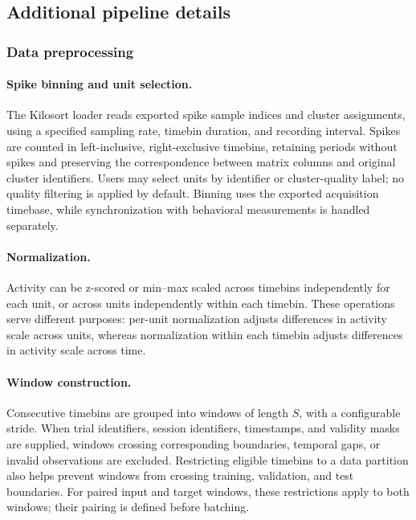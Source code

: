 \subsection{Additional pipeline details}
\label{subsection:additional_pipeline_details}

\subsubsection{Data preprocessing}

\paragraph{Spike binning and unit selection.}
The Kilosort loader reads exported spike sample indices and cluster assignments, using a specified sampling rate, timebin duration, and recording interval. Spikes are counted in left-inclusive, right-exclusive timebins, retaining periods without spikes and preserving the correspondence between matrix columns and original cluster identifiers. Users may select units by identifier or cluster-quality label; no quality filtering is applied by default. Binning uses the exported acquisition timebase, while synchronization with behavioral measurements is handled separately.

\paragraph{Normalization.}
Activity can be z-scored or min--max scaled across timebins independently for each unit, or across units independently within each timebin. These operations serve different purposes: per-unit normalization adjusts differences in activity scale across units, whereas normalization within each timebin adjusts differences in activity scale across time.

\paragraph{Window construction.}
Consecutive timebins are grouped into windows of length $S$, with a configurable stride. When trial identifiers, session identifiers, timestamps, and validity masks are supplied, windows crossing corresponding boundaries, temporal gaps, or invalid observations are excluded. Restricting eligible timebins to a data partition also helps prevent windows from crossing training, validation, and test boundaries. For paired input and target windows, these restrictions apply to both windows; their pairing is defined before batching.

